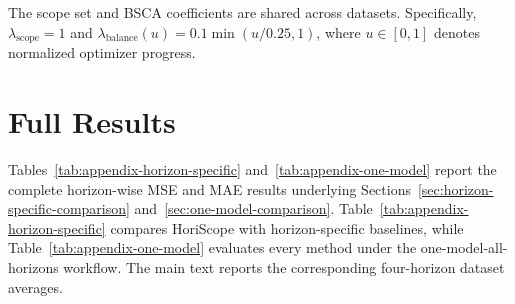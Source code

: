 \documentclass[final,3p,times]{elsarticle}
\begin{document}
\begin{table}[t]
\centering
\scriptsize
\setlength{\tabcolsep}{4pt}
\caption{HoriScope Configuration.}
\label{tab:model-settings}
\end{table}


The scope set and BSCA coefficients are shared across datasets. Specifically, $\lambda_{\mathrm{scope}}=1$ and $\lambda_{\mathrm{balance}}(u)=0.1\min(u/0.25,1)$, where $u\in[0,1]$ denotes normalized optimizer progress.

\setcounter{table}{0}
\setcounter{figure}{0}
\section{Full Results}
\label{app:full-results}


Tables~\ref{tab:appendix-horizon-specific} and~\ref{tab:appendix-one-model} report the complete horizon-wise MSE and MAE results underlying Sections~\ref{sec:horizon-specific-comparison} and~\ref{sec:one-model-comparison}. Table~\ref{tab:appendix-horizon-specific} compares HoriScope with horizon-specific baselines, while Table~\ref{tab:appendix-one-model} evaluates every method under the one-model-all-horizons workflow. The main text reports the corresponding four-horizon dataset averages.
\end{document}
